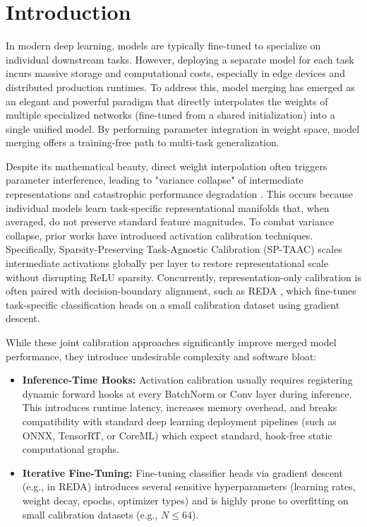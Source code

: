 \documentclass{article}
\theoremstyle{plain}
\theoremstyle{definition}
\theoremstyle{remark}
\begin{document}
\section{Introduction}
\label{sec:intro}

In modern deep learning, models are typically fine-tuned to specialize on individual downstream tasks. However, deploying a separate model for each task incurs massive storage and computational costs, especially in edge devices and distributed production runtimes. To address this, model merging \cite{wortsman2022model, matena2022merging} has emerged as an elegant and powerful paradigm that directly interpolates the weights of multiple specialized networks (fine-tuned from a shared initialization) into a single unified model. By performing parameter integration in weight space, model merging offers a training-free path to multi-task generalization.

Despite its mathematical beauty, direct weight interpolation often triggers parameter interference, leading to "variance collapse" of intermediate representations and catastrophic performance degradation \cite{jordan2022repair, ilharco2022editing}. This occurs because individual models learn task-specific representational manifolds that, when averaged, do not preserve standard feature magnitudes. To combat variance collapse, prior works have introduced activation calibration techniques. Specifically, Sparsity-Preserving Task-Agnostic Calibration (SP-TAAC) scales intermediate activations globally per layer to restore representational scale without disrupting ReLU sparsity. Concurrently, representation-only calibration is often paired with decision-boundary alignment, such as REDA \cite{tang2024fusionbench}, which fine-tunes task-specific classification heads on a small calibration dataset using gradient descent.

While these joint calibration approaches significantly improve merged model performance, they introduce undesirable complexity and software bloat:
\begin{itemize}
    \item \textbf{Inference-Time Hooks:} Activation calibration usually requires registering dynamic forward hooks at every BatchNorm or Conv layer during inference. This introduces runtime latency, increases memory overhead, and breaks compatibility with standard deep learning deployment pipelines (such as ONNX, TensorRT, or CoreML) which expect standard, hook-free static computational graphs.
    \item \textbf{Iterative Fine-Tuning:} Fine-tuning classifier heads via gradient descent (e.g., in REDA) introduces several sensitive hyperparameters (learning rates, weight decay, epochs, optimizer types) and is highly prone to overfitting on small calibration datasets (e.g., $N \le 64$).
\end{itemize}
\end{document}
